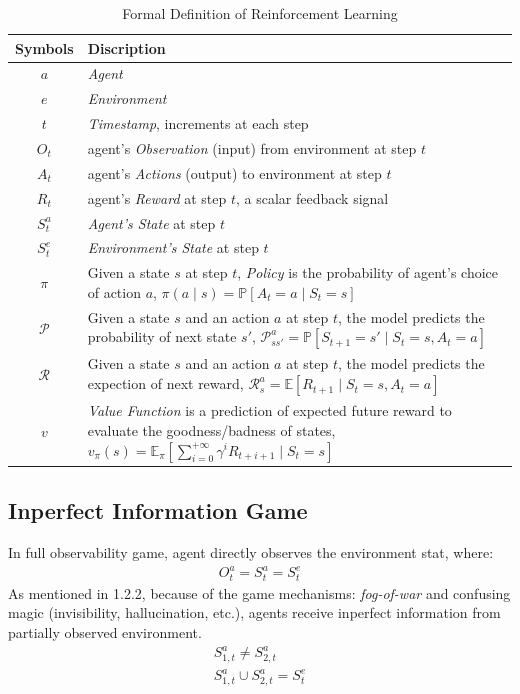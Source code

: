 \documentclass[sigconf]{acmart}
\begin{document}
\begin{table}[htb]
\caption{Formal Definition of Reinforcement Learning\cite{David_Silver:intro_RL}}
\centering
\begin{tabularx}{0.45\textwidth}{cX}
\hline Symbols & Discription \\ \hline
$a$ & \emph{Agent} \\
$e$ & \emph{Environment} \\
$t$ & \emph{Timestamp}, increments at each step \\
$O_t$ & agent's \emph{Observation} (input) from environment at step $t$ \\
$A_t$ & agent's \emph{Actions} (output) to environment at step $t$ \\
$R_t$ & agent's \emph{Reward} at step $t$, a scalar feedback signal\\
$S_t^a$ & \emph{Agent's State} at step $t$ \\
$S_t^e$ & \emph{Environment's State} at step $t$ \\
$\pi$ & Given a state $s$ at step $t$, \emph{Policy} is the probability of agent's choice of action $a$,
$\pi(a \mid s)=\mathbb{P}[A_t=a \mid S_t = s]$ \\
$\mathcal{P}$ & Given a state $s$ and an action $a$ at step $t$, the model predicts the probability of next state $s'$, $\mathcal{P}_{ss'}^a =\mathbb{P}[S_{t+1}=s' \mid S_t=s, A_t=a]$ \\
$\mathcal{R}$ & Given a state $s$ and an action $a$ at step $t$, the model predicts the expection of next reward, $\mathcal{R}_{s}^a =\mathbb{E}[R_{t+1} \mid S_t=s, A_t=a]$ \\
$v$ & \emph{Value Function} is a prediction of expected future reward to evaluate the goodness/badness of states,
$v_\pi(s)=\mathbb{E}_\pi[\sum\limits_{i=0}^{+\infty}\gamma^{i}R_{t+i+1} \mid S_t=s]$
\end{tabularx}
\label{table:formal_definition_of_RL}
\end{table}

\subsection{Inperfect Information Game}
In full observability game, agent directly observes the environment stat, where:
\begin{eqnarray}
O_{t}^a = S_{t}^a = S_{t}^e
\end{eqnarray}
As mentioned in 1.2.2, because of the game mechanisms: \emph{fog-of-war} and confusing magic (invisibility, hallucination, etc.), agents receive inperfect information from partially observed environment.
\begin{eqnarray}
S_{1,t}^{a} \neq S_{2,t}^{a} \\
S_{1,t}^{a} \cup S_{2,t}^{a} = S_t^e
\end{eqnarray}
\end{document}
